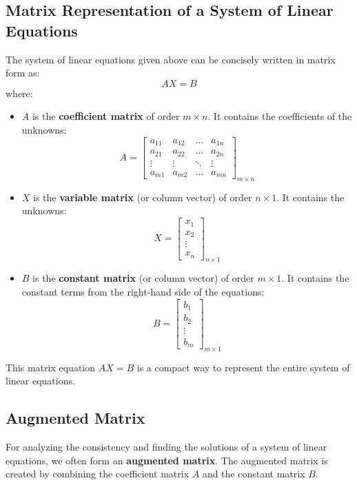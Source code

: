 \documentclass{article}
\begin{document}
\subsection{Matrix Representation of a System of Linear Equations}

The system of linear equations given above can be concisely written in matrix form as:
\[ AX = B \]
where:
\begin{itemize}
    \item $A$ is the \textbf{coefficient matrix} of order $m \times n$. It contains the coefficients of the unknowns:
    \[ A = \begin{bmatrix} a_{11} & a_{12} & \dots & a_{1n} \\ a_{21} & a_{22} & \dots & a_{2n} \\ \vdots & \vdots & \ddots & \vdots \\ a_{m1} & a_{m2} & \dots & a_{mn} \end{bmatrix}_{m \times n} \]
    \item $X$ is the \textbf{variable matrix} (or column vector) of order $n \times 1$. It contains the unknowns:
    \[ X = \begin{bmatrix} x_1 \\ x_2 \\ \vdots \\ x_n \end{bmatrix}_{n \times 1} \]
    \item $B$ is the \textbf{constant matrix} (or column vector) of order $m \times 1$. It contains the constant terms from the right-hand side of the equations:
    \[ B = \begin{bmatrix} b_1 \\ b_2 \\ \vdots \\ b_m \end{bmatrix}_{m \times 1} \]
\end{itemize}
This matrix equation $AX = B$ is a compact way to represent the entire system of linear equations.

\subsection{Augmented Matrix}

For analyzing the consistency and finding the solutions of a system of linear equations, we often form an \textbf{augmented matrix}. The augmented matrix is created by combining the coefficient matrix $A$ and the constant matrix $B$.
\end{document}
